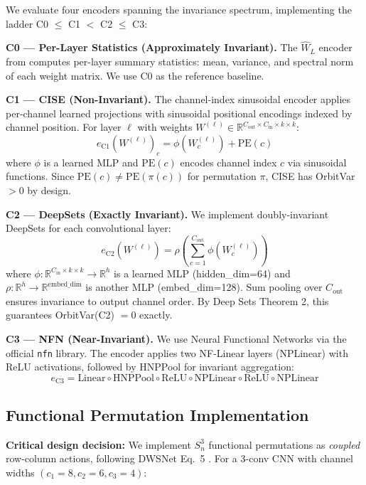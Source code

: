We evaluate four encoders spanning the invariance spectrum, implementing the ladder C0 $\le$ C1 $<$ C2 $\le$ C3:

\textbf{C0 --- Per-Layer Statistics (Approximately Invariant).} The $\hat{W}_L$ encoder from \citet{Unterthiner2020Predicting} computes per-layer summary statistics: mean, variance, and spectral norm of each weight matrix. We use C0 as the reference baseline.

\textbf{C1 --- CISE (Non-Invariant).} The channel-index sinusoidal encoder applies per-channel learned projections with sinusoidal positional encodings indexed by channel position. For layer $\ell$ with weights $W^{(\ell)} \in \mathbb{R}^{C_\text{out} \times C_\text{in} \times k \times k}$:
\[
e_\text{C1}(W^{(\ell)})_c = \phi(W^{(\ell)}_c) + \text{PE}(c)
\]
where $\phi$ is a learned MLP and $\text{PE}(c)$ encodes channel index $c$ via sinusoidal functions. Since $\text{PE}(c) \ne \text{PE}(\pi(c))$ for permutation $\pi$, CISE has OrbitVar $> 0$ by design.

\textbf{C2 --- DeepSets (Exactly Invariant).} We implement doubly-invariant DeepSets \cite{Zaheer2017Deep} for each convolutional layer:
\[
e_\text{C2}(W^{(\ell)}) = \rho\!\left(\sum_{c=1}^{C_\text{out}} \phi(W^{(\ell)}_c)\right)
\]
where $\phi: \mathbb{R}^{C_\text{in} \times k \times k} \to \mathbb{R}^h$ is a learned MLP (hidden\_dim=64) and $\rho: \mathbb{R}^h \to \mathbb{R}^{\text{embed\_dim}}$ is another MLP (embed\_dim=128). Sum pooling over $C_\text{out}$ ensures invariance to output channel order. By Deep Sets Theorem 2, this guarantees OrbitVar(C2) $= 0$ exactly.

\textbf{C3 --- NFN (Near-Invariant).} We use Neural Functional Networks \cite{Zhou2023Permutation} via the official \texttt{nfn} library. The encoder applies two NF-Linear layers (NPLinear) with ReLU activations, followed by HNPPool for invariant aggregation:
\[
e_\text{C3} = \text{Linear} \circ \text{HNPPool} \circ \text{ReLU} \circ \text{NPLinear} \circ \text{ReLU} \circ \text{NPLinear}
\]

\subsection{Functional Permutation Implementation}

\textbf{Critical design decision:} We implement $S_n^3$ functional permutations as \emph{coupled} row-column actions, following DWSNet Eq.~5 \cite{Navon2023Equivariant}. For a 3-conv CNN with channel widths $(c_1=8, c_2=6, c_3=4)$:

